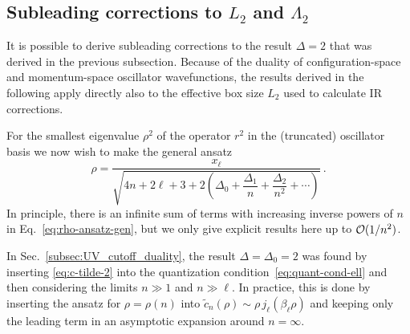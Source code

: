   \subsection{Subleading corrections to $L_2$ and $\Lambda_2$}
  \label{subsec:appendix_subleading}

  It is possible to derive subleading corrections to the result $\Delta=2$ that
  was derived in the previous subsection.  Because of the duality of
  configuration-space and momentum-space oscillator wavefunctions, the results
  derived in the following apply directly also to the effective box size $L_2$
  used to calculate IR corrections.

  For the smallest eigenvalue $\rho^2$ of the operator $r^2$ in the (truncated)
  oscillator basis we now wish to make the general ansatz
  \begin{equation}
   \rho = \frac{x_\ell}{\sqrt{4n+2\ell+3+2
   \left(\Delta_0+\dfrac{\Delta_1}{n}+\dfrac{\Delta_2}{n^2}+\cdots\right)}} \,.
  \label{eq:rho-ansatz-gen}
  \end{equation}
  In principle, there is an infinite sum of terms with increasing inverse
  powers
  of $n$ in Eq.~\eqref{eq:rho-ansatz-gen}, but we only give explicit results
  here up to $\mathcal{O}(1/n^2)$.

  In Sec.~\ref{subsec:UV_cutoff_duality}, the result $\Delta=\Delta_0=2$ was found by
  inserting \eqref{eq:c-tilde-2} into the quantization
  condition~\eqref{eq:quant-cond-ell} and then considering the limits $n\gg1$
  and $n\gg\ell$.  In practice, this is done by inserting the ansatz for
  $\rho=\rho(n)$ into $\tilde{c}_n(\rho)\sim \rho\,j_\ell(\beta_\ell\rho)$ and
  keeping only the leading term in an asymptotic expansion around $n=\infty$.

